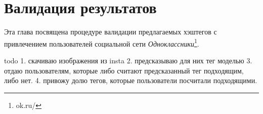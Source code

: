 \section{Валидация результатов}

\indent
\indent
Эта глава посвящена процедуре валидации предлагаемых 
хэштегов с привлечением пользователей социальной сети 
\textit{Одноклассники}\footnote{ok.ru/}.

todo
1. скачиваю изображения из insta
2. предсказываю для них тег моделью
3. отдаю пользователям, которые либо считают предсказанный 
тег подходящим, либо нет.
4. привожу долю тегов, которые пользователи посчитали подходящими.